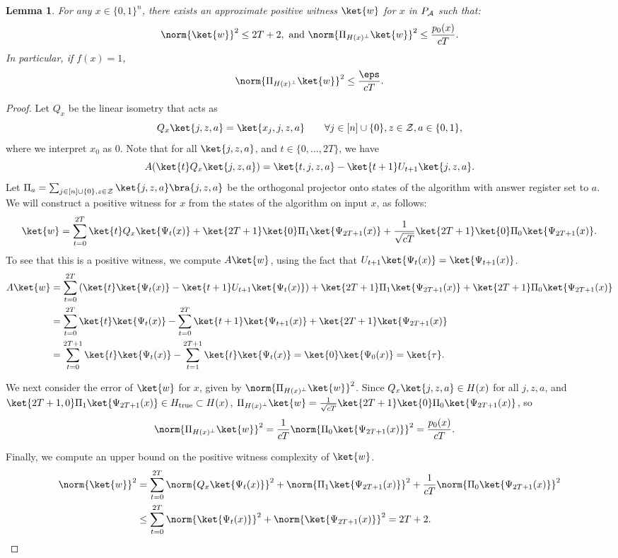 \documentclass[11pt]{article}
\numberwithin{equation}{section}
\newtheorem{lemma}[theorem]{Lemma}
\theoremstyle{definition}
\theoremstyle{plain}
\begin{document}
\begin{lemma}\label{lem:alg-to-span-pos}
For any $x\in\{0,1\}^n$, there exists an approximate positive witness $\ket{w}$ for $x$ in $P_{\cal A}$ such that:
$$\norm{\ket{w}}^2 \leq 2T+2,
\mbox{ and }
\norm{\Pi_{H(x)^\bot}\ket{w}}^2\leq \frac{p_0(x)}{cT}.$$ 
In particular, if $f(x)=1$, 
$$\norm{\Pi_{H(x)^\bot}\ket{w}}^2\leq \frac{\eps}{cT}.$$ 
\end{lemma}
\begin{proof}
Let $Q_x$ be the linear isometry that acts as 
$$Q_x\ket{j,z,a}=\ket{x_j,j,z,a}\qquad \forall j\in [n]\cup\{0\}, z\in{\cal Z},a\in\{0,1\},$$
where we interpret $x_0$ as 0. Note that for all $\ket{j,z,a}$, and $t\in \{0,\dots,2T\}$, we have 
$$A(\ket{t}Q_x\ket{j,z,a}) = \ket{t,j,z,a}-\ket{t+1}U_{t+1}\ket{j,z,a}.$$
Let $\Pi_a=\sum_{j\in [n]\cup\{0\},z\in{\cal Z}}\ket{j,z,a}\bra{j,z,a}$ be the orthogonal projector onto states of the algorithm with answer register set to $a$.
We will construct a positive witness for $x$ from the states of the algorithm on input $x$, as follows:
$$\ket{w}=\sum_{t=0}^{2T}\ket{t}Q_x\ket{\Psi_t(x)}+\ket{2T+1}\ket{0}\Pi_1\ket{\Psi_{2T+1}(x)}+\frac{1}{\sqrt{cT}}\ket{2T+1}\ket{0}\Pi_0\ket{\Psi_{2T+1}(x)}.$$
To see that this is a positive witness, we compute $A\ket{w}$, using the fact that $U_{t+1}\ket{\Psi_t(x)}=\ket{\Psi_{t+1}(x)}$. %
%
\begin{align*}
A\ket{w} &= \sum_{t=0}^{2T}\left(\ket{t}\ket{\Psi_t(x)} - \ket{t+1}U_{t+1}\ket{\Psi_t(x)}\right)+\ket{2T+1}\Pi_1\ket{\Psi_{2T+1}(x)}+\ket{2T+1}\Pi_0\ket{\Psi_{2T+1}(x)}\\
&= \sum_{t=0}^{2T}\ket{t}\ket{\Psi_t(x)} - \sum_{t=0}^{2T}\ket{t+1}\ket{\Psi_{t+1}(x)}+\ket{2T+1}\ket{\Psi_{2T+1}(x)}\\
&= \sum_{t=0}^{2T+1}\ket{t}\ket{\Psi_t(x)} - \sum_{t=1}^{2T+1}\ket{t}\ket{\Psi_t(x)} = \ket{0}\ket{\Psi_0(x)} = \ket{\tau}.
\end{align*}

We next consider the error of $\ket{w}$ for $x$, given by $\norm{\Pi_{H(x)^\bot}\ket{w}}^2$. Since $Q_x\ket{j,z,a}\in H(x)$ for all $j,z,a$, and $\ket{2T+1,0}\Pi_1\ket{\Psi_{2T+1}(x)}\in H_{\mathrm{true}}\subset H(x)$,
$\Pi_{H(x)^\bot}\ket{w} = \frac{1}{\sqrt{cT}}\ket{2T+1}\ket{0}\Pi_0\ket{\Psi_{2T+1}(x)}$, so
\begin{align*}
\norm{\Pi_{H(x)^\bot}\ket{w}}^2 &= \frac{1}{cT}\norm{\Pi_0\ket{\Psi_{2T+1}(x)}}^2 = \frac{p_0(x)}{cT}.
\end{align*}

Finally, we compute %
an upper bound on the   %
positive witness complexity
of $\ket{w}$. %
\begin{align*}
\norm{\ket{w}}^2 &= \sum_{t=0}^{2T}\norm{Q_x\ket{\Psi_t(x)}}^2 + \norm{\Pi_1\ket{\Psi_{2T+1}(x)}}^2 + \frac{1}{cT}\norm{\Pi_0\ket{\Psi_{2T+1}(x)}}^2\\
&\leq \sum_{t=0}^{2T}\norm{\ket{\Psi_{t}(x)}}^2 + \norm{\ket{\Psi_{2T+1}(x)}}^2 = 2T+2.\qedhere
\end{align*}
\end{proof}
\end{document}

